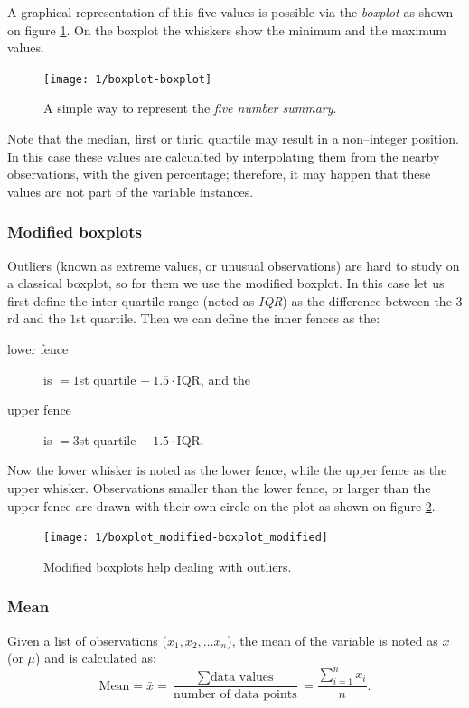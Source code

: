 A graphical representation of this five values is possible via the
\emph{boxplot} as shown on figure \ref{fig:boxplot}. On the boxplot the whiskers
show the minimum and the maximum values.

\begin{figure}[htbp]
\label{fig:boxplot}
\caption{A simple way to represent the \emph{five number summary}.}
\texttt{[image: 1/boxplot-boxplot]}
\end{figure}

Note that the median, first or thrid quartile may result in a non--integer
position. In this case these values are calcualted by interpolating them from
the nearby observations, with the given percentage; therefore, it may happen that
these values are not part of the variable instances.

\subsubsection{Modified boxplots}
Outliers (known as extreme values, or unusual observations) are hard
to study on a classical boxplot, so for them we use the modified boxplot. In
this case let us first define the inter-quartile range (noted as \emph{IQR}) as
the difference between the $3$rd and the $1$st quartile. Then we can define the
inner fences as the:

\begin{description}
  \item[lower fence]  is $=1$st quartile $- ~1.5\cdot $IQR, and the  
  \item[upper fence]  is $=3$st quartile $+ ~1.5\cdot $IQR.  
\end{description}

Now the lower whisker is noted as the lower fence, while the upper fence as the
upper whisker. Observations smaller than the lower fence, or larger than the
upper fence are drawn with their own circle on the plot as shown on figure
\ref{fig:boxplot_modified}.

\begin{figure}[htbp]
\label{fig:boxplot_modified}
\caption{Modified boxplots help dealing with outliers.}
\texttt{[image: 1/boxplot\_modified-boxplot\_modified]}
\end{figure}

\subsubsection{Mean}
Given a list of observations ($x_1, x_2, \ldots x_n$), the mean of the variable
is noted as $\bar{x}$ (or $\mu$) and is calculated as: 
\[ \mbox{Mean} = \bar{x} = 
\frac{\sum{\mbox{data values}}}{\mbox{number of data points}} =
\frac{\sum_{i=1}^{n}{x_i}}{n}.
\]

